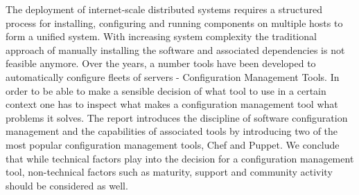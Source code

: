 The deployment of internet-scale distributed systems requires a structured process for installing, configuring and running components on multiple hosts to form a unified system. With increasing system complexity the traditional approach of manually installing the software and associated dependencies is not feasible anymore. Over the years, a number tools have been developed to automatically configure fleets of servers - Configuration Management Tools. In order to be able to make a sensible decision of what tool to use in a certain context one has to inspect what makes a configuration management tool what problems it solves. The report introduces the discipline of software configuration management and the capabilities of associated tools by introducing two of the most popular configuration management tools, Chef and Puppet. We conclude that while technical factors play into the decision for a configuration management tool, non-technical factors such as maturity, support and community activity should be considered as well.